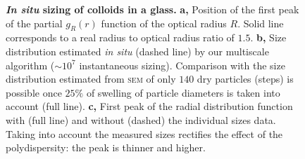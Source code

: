 \documentclass[8.5pt,twoside,twocolumn]{article}
\begin{document}
\begin{figure}
	\caption{\textbf{\emph{In situ} sizing of colloids in a glass.} \textbf{a,} Position of the first peak of the partial $g_R(r)$ function of the optical radius $R$. Solid line corresponds to a real radius to optical radius ratio of $1.5$. \textbf{b,} Size distribution estimated \emph{in situ} (dashed line) by our multiscale algorithm ($\sim 10^7$ instantaneous sizing). Comparison with the size distribution estimated from \textsc{sem} of only $140$ dry particles (steps) is possible once $25\%$ of swelling of particle diameters is taken into account (full line). \textbf{c,} First peak of the radial distribution function with (full line) and without (dashed) the individual sizes data. Taking into account the measured sizes rectifies the effect of the polydispersity: the peak is thinner and higher.}
	\label{fig:sizing}
\end{figure}
\end{document}
